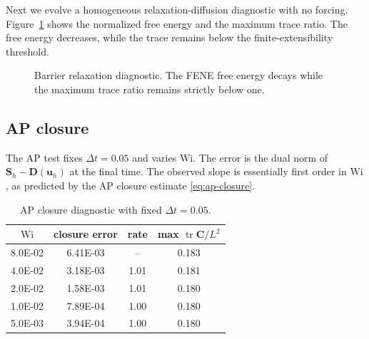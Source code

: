 ﻿\documentclass[11pt]{amsart}
\newcommand{\CC}{\bm C}
\newcommand{\DD}{\bm D}
\newcommand{\EE}{\mathcal E}
\newcommand{\SSS}{\bm S}
\newcommand{\uu}{\bm u}
\newcommand{\Wi}{\mathrm{Wi}}
\newcommand{\tr}{\operatorname{tr}}
\begin{document}
Next we evolve a homogeneous relaxation-diffusion diagnostic with no forcing.  Figure~\ref{fig:energy-trace} shows the normalized free energy and the maximum trace ratio.  The free energy decreases, while the trace remains below the finite-extensibility threshold.

\begin{figure}[htbp]
\centering
{}
\caption{Barrier relaxation diagnostic.  The FENE free energy decays while the maximum trace ratio remains strictly below one.}
\label{fig:energy-trace}
\end{figure}

\subsection{AP closure}

The AP test fixes $\Delta t=0.05$ and varies $\Wi$.  The error is the dual norm of $\SSS_h-\DD(\uu_h)$ at the final time.  The observed slope is essentially first order in $\Wi$, as predicted by the AP closure estimate \eqref{eq:ap-closure}.

\begin{table}[htbp]
\centering
\caption{AP closure diagnostic with fixed $\Delta t=0.05$.}
\label{tab:ap-fene}
\begin{tabular}{cccc}
\toprule
$\Wi$ & closure error & rate & max $\tr\CC/L^2$ \\
\midrule
8.0E-02 & 6.41E-03 & -- & 0.183 \\
4.0E-02 & 3.18E-03 & 1.01 & 0.181 \\
2.0E-02 & 1.58E-03 & 1.01 & 0.180 \\
1.0E-02 & 7.89E-04 & 1.00 & 0.180 \\
5.0E-03 & 3.94E-04 & 1.00 & 0.180 \\
\bottomrule
\end{tabular}
\end{table}
\end{document}
